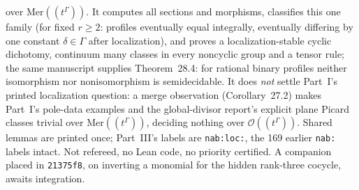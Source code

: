 \documentclass[11pt]{article}
\begin{document}
{over $\mathrm{Mer}((t^\Gamma))$.  It computes all sections and morphisms,
classifies this one family (for fixed $r\ge2$: profiles eventually equal
integrally, eventually differing by one constant $\delta\in\Gamma$ after
localization), and proves a localization-stable cyclic dichotomy, continuum
many classes in every noncyclic group and a tensor rule; the same manuscript
supplies Theorem~28.4: for rational binary profiles neither isomorphism nor
nonisomorphism is semidecidable.  It does \emph{not} settle Part~I's printed
localization question: a merge observation (Corollary~27.2) makes Part~I's
pole-data examples and the global-divisor report's explicit plane Picard
classes trivial over $\mathrm{Mer}((t^\Gamma))$, deciding nothing over
$\mathcal O((t^\Gamma))$.  Shared lemmas are printed once; Part~III's labels
are \texttt{nab:loc:}, the 169 earlier \texttt{nab:} labels intact.  Not
refereed, no Lean code, no priority certified.  A companion placed in
\texttt{21375f8}, on inverting a monomial for the hidden rank-three cocycle,
awaits integration.}
\end{document}
